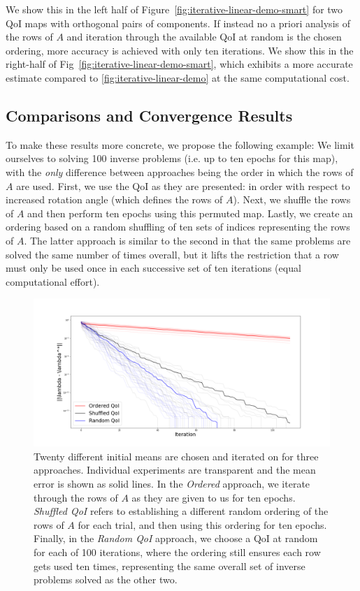 We show this in the left half of Figure~\ref{fig:iterative-linear-demo-smart} for two QoI maps with orthogonal pairs of components.
If instead no a priori analysis of the rows of $A$ and iteration through the available QoI at random is the chosen ordering, more accuracy is achieved with only ten iterations.
We show this in the right-half of Fig~\ref{fig:iterative-linear-demo-smart}, which exhibits a more accurate estimate compared to \ref{fig:iterative-linear-demo} at the same computational cost.


\subsection{Comparisons and Convergence Results}
To make these results more concrete, we propose the following example:
We limit ourselves to solving 100 inverse problems (i.e. up to ten epochs for this map), with the \emph{only} difference between approaches being the order in which the rows of $A$ are used.
First, we use the QoI as they are presented: in order with respect to increased rotation angle (which defines the rows of $A$).
Next, we shuffle the rows of $A$ and then perform ten epochs using this permuted map.
Lastly, we create an ordering based on a random shuffling of ten sets of indices representing the rows of $A$.
The latter approach is similar to the second in that the same problems are solved the same number of times overall, but it lifts the restriction that a row must only be used once in each successive set of ten iterations (equal computational effort).

\begin{figure}
  \centering
  \includegraphics[width=0.95\linewidth]{examples/iterative/10D-convergence-comparison.png}
  \caption{
  Twenty different initial means are chosen and iterated on for three approaches.
  Individual experiments are transparent and the mean error is shown as solid lines.
  In the \emph{Ordered} approach, we iterate through the rows of $A$ as they are given to us for ten epochs.
  \emph{Shuffled QoI} refers to establishing a different random ordering of the rows of $A$ for each trial, and then
  using this ordering for ten epochs.
  Finally, in the \emph{Random QoI} approach, we choose a QoI at random for each of 100 iterations, where the ordering still ensures each row gets used ten times, representing the same overall set of inverse problems solved as the other two.
  }
  \label{fig:iterative-convergence-comparison}
\end{figure}


